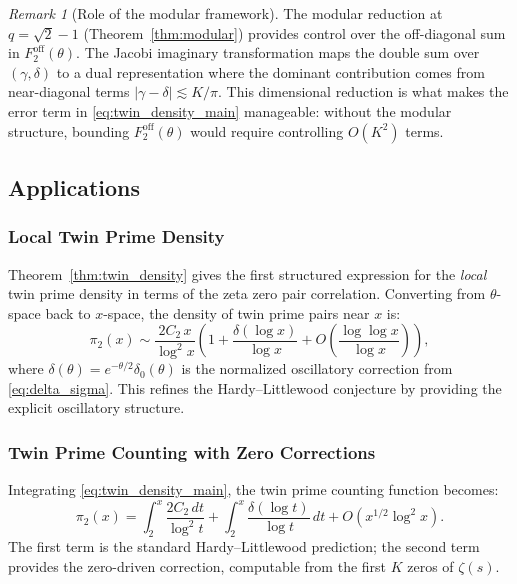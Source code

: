 \documentclass[11pt,a4paper]{article}
\theoremstyle{remark}
\newtheorem{remark}[theorem]{Remark}
\begin{document}
\begin{remark}[Role of the modular framework]
The modular reduction at $q=\sqrt{2}-1$ (Theorem~\ref{thm:modular}) provides control over the off-diagonal sum in $F_2^{\mathrm{off}}(\theta)$.
The Jacobi imaginary transformation maps the double sum over $(\gamma,\delta)$ to a dual representation where the dominant contribution comes from near-diagonal terms $|\gamma-\delta| \lesssim K/\pi$.
This dimensional reduction is what makes the error term in \eqref{eq:twin_density_main} manageable: without the modular structure, bounding $F_2^{\mathrm{off}}(\theta)$ would require controlling $O(K^2)$ terms.
\end{remark}

\subsection{Applications}\label{sec:applications}

\subsubsection{Local Twin Prime Density}

Theorem~\ref{thm:twin_density} gives the first structured expression for the \emph{local} twin prime density in terms of the zeta zero pair correlation.
Converting from $\theta$-space back to $x$-space, the density of twin prime pairs near $x$ is:
\begin{equation}\label{eq:twin_x_density}
\pi_2(x) \sim \frac{2C_2\,x}{\log^2 x}\left(1 + \frac{\delta(\log x)}{\log x} + O\!\left(\frac{\log\log x}{\log x}\right)\right),
\end{equation}
where $\delta(\theta) = e^{-\theta/2}\delta_0(\theta)$ is the normalized oscillatory correction from \eqref{eq:delta_sigma}.
This refines the Hardy--Littlewood conjecture by providing the explicit oscillatory structure.

\subsubsection{Twin Prime Counting with Zero Corrections}

Integrating \eqref{eq:twin_density_main}, the twin prime counting function becomes:
\begin{equation}\label{eq:twin_count}
\pi_2(x) = \int_2^x \frac{2C_2\,dt}{\log^2 t} + \int_2^x \frac{\delta(\log t)}{\log t}\,dt + O(x^{1/2}\log^2 x).
\end{equation}
The first term is the standard Hardy--Littlewood prediction; the second term provides the zero-driven correction, computable from the first $K$ zeros of $\zeta(s)$.
\end{document}
